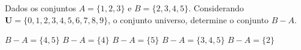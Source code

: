 \noindent\parbox{\linewidth}{

Dados os conjuntos $A=\{1,2,3\}$ e $B=\{2,3,4,5\}$. Considerando $\mathbf{U}=\{0,1,2,3,4,5,6,7,8,9\}$, o conjunto universo, determine o conjunto $B-A$.

$B-A=\{4,5\}$
$B-A=\{4\}$
$B-A=\{5\}$
$B-A=\{3,4,5\}$
$B-A=\{2\}$




}


